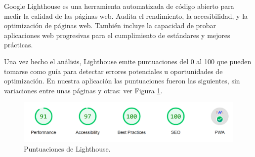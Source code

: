 \documentclass[12pt,twoside,titlepage]{report}
\begin{document}
Google Lighthouse es una herramienta automatizada de código abierto para medir la calidad de las páginas web. Audita el rendimiento, la accesibilidad, y la optimización de páginas web.
También incluye la capacidad de probar aplicaciones web progresivas para el cumplimiento de estándares y mejores prácticas.


Una vez hecho el análisis, Lighthouse emite puntuaciones del 0 al 100 que pueden tomarse como guía para detectar errores potenciales u oportunidades de optimización. En nuestra aplicación las puntuaciones fueron las siguientes, sin variaciones entre unas páginas y otras: ver Figura \ref{fig:Lighthouse_resumen}.

\begin{figure}[H]
    \centering
    \includegraphics[width=\textwidth]{Lighthouse/Resumen}
    \caption{Puntuaciones de Lighthouse.}
    \label{fig:Lighthouse_resumen}
\end{figure}
\end{document}
